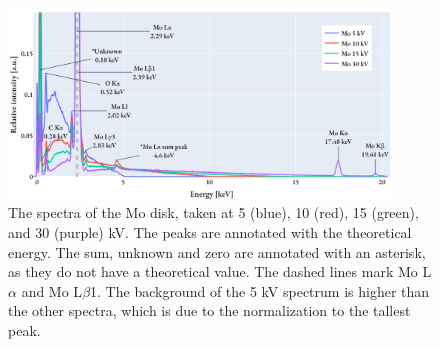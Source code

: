 \begin{figure}[b!]
    \centering
    \includegraphics[width=0.90\textwidth]{figures/each_spectra/Mo_everything.png}
    \caption{
        The spectra of the Mo disk, taken at 5 (blue), 10 (red), 15 (green), and 30 (purple) kV.
        The peaks are annotated with the theoretical energy.
        The sum, unknown and zero are annotated with an asterisk, as they do not have a theoretical value.
        The dashed lines mark Mo L$\alpha$ and Mo L$\beta$1. %
        The background of the 5 kV spectrum is higher than the other spectra, which is due to the normalization to the tallest peak. %
    }
    \label{fig:results:Spectra_Mo}
\end{figure}



